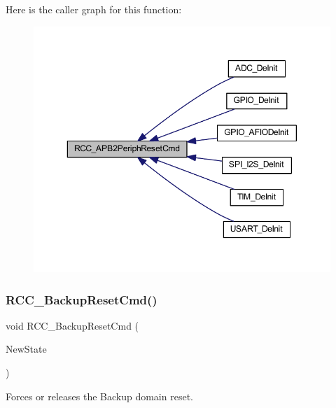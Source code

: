 Here is the caller graph for this function\+:
\nopagebreak
\begin{figure}[H]
\begin{center}
\leavevmode
\includegraphics[width=350pt]{group___r_c_c___exported___functions_gad94553850ac07106a27ee85fec37efdf_icgraph}
\end{center}
\end{figure}
\mbox{\label{group___r_c_c___exported___functions_ga636c3b72f35391e67f12a551b15fa54a}} 
\subsubsection{\texorpdfstring{R\+C\+C\+\_\+\+Backup\+Reset\+Cmd()}{RCC\_BackupResetCmd()}}
{\footnotesize\ttfamily void R\+C\+C\+\_\+\+Backup\+Reset\+Cmd (\begin{DoxyParamCaption}\item[{\hyperlink{group___exported__types_gac9a7e9a35d2513ec15c3b537aaa4fba1}{Functional\+State}}]{New\+State }\end{DoxyParamCaption})}



Forces or releases the Backup domain reset. 



